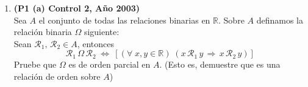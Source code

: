 \documentclass[10pt]{article}
\newcommand{\R}{\mathbb R}
\newcommand{\N}{\mathbb N}
\newcommand{\id}{\operatorname{Id}} %
\theoremstyle{plain}
\newcommand{\cur}[1]{\mathcal{#1}}
\theoremstyle{definition}
\begin{document}
\begin{enumerate}[label=\textbf{P\arabic*.-}]

\item \textbf{(P1 (a) Control 2, Año 2003)}\\
Sea $A$ el conjunto de todas las relaciones binarias en $\R$. Sobre $A$ definamos la relación binaria $\Omega$ siguiente:\\
Sean $\cur{R}_1,\, \cur{R}_2 \in A$, entonces
$$\cur{R}_1\,\Omega\, \cur{R}_2 \; \Longleftrightarrow \: \left[ (\forall \; x,y\in\R)\;(x\,\cur{R}_1 \, y \, \Rightarrow \, x\,\cur{R}_2\,y)\right]$$
Pruebe que $\Omega$ es de orden parcial en $A$. (Esto es, demuestre que es una relación de orden sobre $A$)


\end{enumerate}
\end{document}
